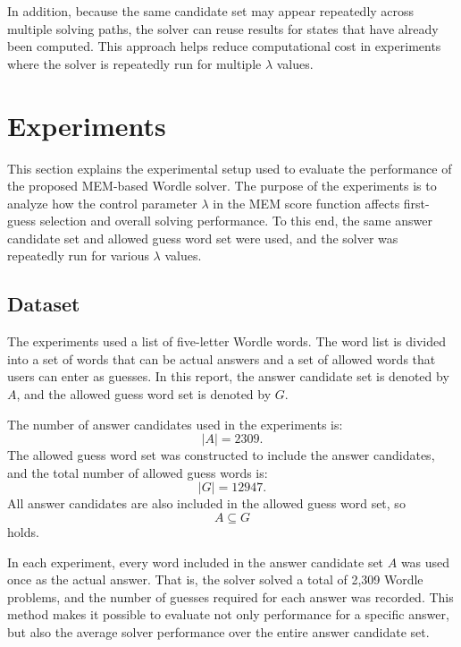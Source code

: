 \documentclass[11pt]{article}
\begin{document}
In addition, because the same candidate set may appear repeatedly across multiple solving paths, the solver can reuse results for states that have already been computed.
This approach helps reduce computational cost in experiments where the solver is repeatedly run for multiple $\lambda$ values.















\section{Experiments}
\label{sec:experiments}

This section explains the experimental setup used to evaluate the performance of the proposed MEM-based Wordle solver.
The purpose of the experiments is to analyze how the control parameter $\lambda$ in the MEM score function affects first-guess selection and overall solving performance.
To this end, the same answer candidate set and allowed guess word set were used, and the solver was repeatedly run for various $\lambda$ values.

\subsection{Dataset}

The experiments used a list of five-letter Wordle words.
The word list is divided into a set of words that can be actual answers and a set of allowed words that users can enter as guesses.
In this report, the answer candidate set is denoted by $A$, and the allowed guess word set is denoted by $G$.

The number of answer candidates used in the experiments is:
\[
|A| = 2309.
\]
The allowed guess word set was constructed to include the answer candidates, and the total number of allowed guess words is:
\[
|G| = 12947.
\]
All answer candidates are also included in the allowed guess word set, so
\[
A \subseteq G
\]
holds.

In each experiment, every word included in the answer candidate set $A$ was used once as the actual answer.
That is, the solver solved a total of 2,309 Wordle problems, and the number of guesses required for each answer was recorded.
This method makes it possible to evaluate not only performance for a specific answer, but also the average solver performance over the entire answer candidate set.
\end{document}
